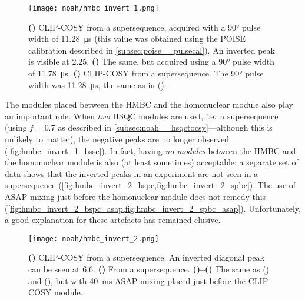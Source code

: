 \begin{figure}[htb]
    \centering
    \texttt{[image: noah/hmbc\_invert\_1.png]}%
    {\label{fig:hmbc_invert_1_orig}}%
    {\label{fig:hmbc_invert_1_pw}}%
    {\label{fig:hmbc_invert_1_bssc}}%
    \caption[Inverted peaks in homonuclear module of -type supersequences]{
        \textbf{()} CLIP-COSY from a  supersequence, acquired with a \proton{} \ang{90} pulse width of \qty{11.28}{\us} (this value was obtained using the POISE calibration described in \cref{subsec:poise__pulsecal}).
        An inverted peak is visible at \qty{2.25}{\ppm}.
        \textbf{()} The same, but acquired using a \ang{90} pulse width of \qty{11.78}{\us}.
        \textbf{()} CLIP-COSY from a  supersequence. The \ang{90} pulse width was \qty{11.28}{\us}, the same as in ().
    }
    \label{fig:hmbc_invert_1}
\end{figure}

The modules placed between the HMBC and the homonuclear module also play an important role.
When \textit{two} HSQC modules are used, i.e.\ a  supersequence (using $f = 0.7$ as described in \cref{subsec:noah__hsqctocsy}---although this is unlikely to matter), the negative peaks are no longer observed (\cref{fig:hmbc_invert_1_bssc}).
In fact, having \textit{no modules} between the HMBC and the homonuclear module is also (at least sometimes) acceptable: a separate set of data shows that the inverted peaks in an  experiment are not seen in a  supersequence (\cref{fig:hmbc_invert_2_bspc,fig:hmbc_invert_2_spbc}).
The use of ASAP mixing just before the homonuclear module does not remedy this (\cref{fig:hmbc_invert_2_bspc_asap,fig:hmbc_invert_2_spbc_asap}).
Unfortunately, a good explanation for these artefacts has remained elusive.

\begin{figure}[!ht]
    \centering
    \texttt{[image: noah/hmbc\_invert\_2.png]}%
    {\label{fig:hmbc_invert_2_bspc}}%
    {\label{fig:hmbc_invert_2_spbc}}%
    {\label{fig:hmbc_invert_2_bspc_asap}}%
    {\label{fig:hmbc_invert_2_spbc_asap}}%
    \caption[Effect of module ordering and ASAP mixing on inverted peaks in -type supersequences]{
        \textbf{()} CLIP-COSY from a  supersequence.
        An inverted diagonal peak can be seen at \qty{6.6}{\ppm}.
        \textbf{()} From a  supersequence.
        \textbf{()--()} The same as () and (), but with \qty{40}{\ms} ASAP mixing placed just before the CLIP-COSY module.
    }
    \label{fig:hmbc_invert_2}
\end{figure}

